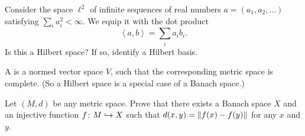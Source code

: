 \begin{problem}
	Consider the space $\ell^2$ of infinite sequences of real numbers
	$a = (a_1, a_2, \dots)$ satisfying $\sum_i a_i^2 < \infty$.
	We equip it with the dot product
	\[ \left< a, b\right> = \sum_i a_i b_i. \]
	Is this a Hilbert space?
	If so, identify a Hilbert basis.
\end{problem}

\begin{problem}
	A  is a normed vector space $V$,
	such that the corresponding metric space is complete.
	(So a Hilbert space is a special case of a Banach space.)

	Let $(M,d)$ be any metric space.
	Prove that there exists a Banach space $X$
	and an injective function $f \colon M \hookrightarrow X$
	such that $d(x,y) = \left\lVert f(x)-f(y) \right\rVert$ for any $x$ and $y$.
\end{problem}
